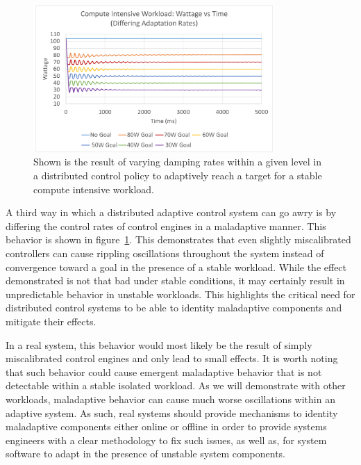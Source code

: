             \begin{figure}[htb!]
                \centering
                \includegraphics[width=0.82\textwidth]{Fig/compute_differing_graph.pdf}
                \caption[Compute Intensive Workload Using an Adaptive Goal Adjustment Policy with Differing Rates (Watts vs Time)]{Shown is the result of varying damping rates within a given level in a distributed control policy to adaptively reach a target for a stable compute intensive workload.}
                \label{fig:compute_differing_graph}
            \end{figure}

            A third way in which a distributed adaptive control system can go awry is by differing the control rates of control engines in a maladaptive manner. This behavior is shown in figure~\ref{fig:compute_differing_graph}. This demonstrates that even slightly miscalibrated controllers can cause rippling oscillations throughout the system instead of convergence toward a goal in the presence of a stable workload. While the effect demonstrated is not that bad under stable conditions, it may certainly result in unpredictable behavior in unstable workloads. This highlights the critical need for distributed control systems to be able to identity maladaptive components and mitigate their effects.

            In a real system, this behavior would most likely be the result of simply miscalibrated control engines and only lead to small effects. It is worth noting that such behavior could cause emergent maladaptive behavior that is not detectable within a stable isolated workload. As we will demonstrate with other workloads, maladaptive behavior can cause much worse oscillations within an adaptive system. As such, real systems should provide mechanisms to identity maladaptive components either online or offline in order to provide systems engineers with a clear methodology to fix such issues, as well as, for system software to adapt in the presence of unstable system components.

